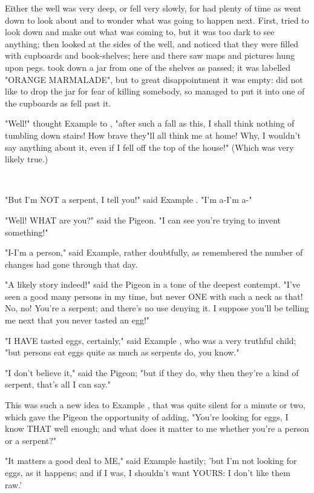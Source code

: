 \documentclass{article}
\begin{document}
\set
Either the well was very deep, or \they fell very slowly, for \they had plenty of time as \they went down to look about \them and to wonder what was going to happen next. First, \they tried to look down and make out what \they was coming to, but it was too dark to see anything; then \they looked at the sides of the well, and noticed that they were filled with cupboards and book-shelves; here and there \they saw maps and pictures hung upon pegs. \They took down a jar from one of the shelves as \they passed; it was labelled "ORANGE MARMALADE", but to \their great disappointment it was empty: \they did not like to drop the jar for fear of killing somebody, so managed to put it into one of the cupboards as \they fell past it.

\set
"Well!" thought  Example  to \themself, "after such a fall as this, I shall think nothing of tumbling down stairs! How brave they"ll all think me at home! Why, I wouldn't say anything about it, even if I fell off the top of the house!" (Which was very likely true.)

~

"But I'm NOT a serpent, I tell you!" said  Example . "I'm a-I'm a-"

"Well! WHAT are you?" said the Pigeon. "I can see you're trying to invent something!"

\set
"I-I'm a person," said  Example, rather doubtfully, as \they remembered the number of changes \they had gone through that day.

"A likely story indeed!" said the Pigeon in a tone of the deepest contempt. "I've seen a good many persons in my time, but never ONE with such a neck as that! No, no! You're a serpent; and there's no use denying it. I suppose you'll be telling me next that you never tasted an egg!"

"I HAVE tasted eggs, certainly," said  Example , who was a very truthful child; "but persons eat eggs quite as much as serpents do, you know."

\set
"I don't believe it," said the Pigeon; "but if they do, why then they're a kind of serpent, that's all I can say."

\set
This was such a new idea to  Example , that \they was quite silent for a minute or two, which gave the Pigeon the opportunity of adding, "You're looking for eggs, I know THAT well enough; and what does it matter to me whether you're a person or a serpent?"

\set
"It matters a good deal to ME," said  Example  hastily; 'but I'm not looking for eggs, as it happens; and if I was, I shouldn't want YOURS: I don't like them raw.'
\end{document}
